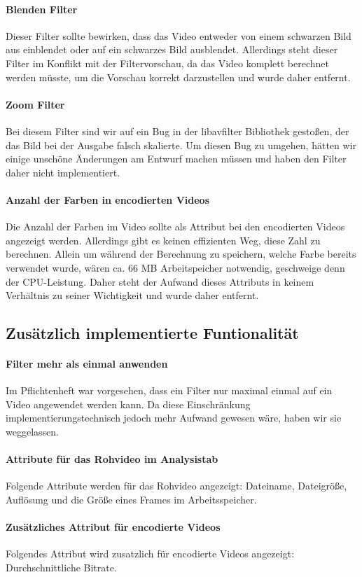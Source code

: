 \documentclass{scrartcl}
\begin{document}
{\paragraph{Blenden Filter} Dieser Filter sollte bewirken, dass das Video entweder von einem schwarzen Bild aus einblendet oder auf ein schwarzes Bild ausblendet. Allerdings steht dieser Filter im Konflikt mit der Filtervorschau, da das Video komplett berechnet werden müsste, um die Vorschau korrekt darzustellen und wurde daher entfernt.
\paragraph{Zoom Filter} Bei diesem Filter sind wir auf ein Bug in der libavfilter Bibliothek gestoßen, der das Bild bei der Ausgabe falsch skalierte. Um diesen Bug zu umgehen, hätten wir einige unschöne Änderungen am Entwurf machen müssen und haben den Filter daher nicht implementiert.
\paragraph{Anzahl der Farben in encodierten Videos} Die Anzahl der Farben im Video sollte als Attribut bei den encodierten Videos angezeigt werden. Allerdings gibt es keinen effizienten Weg, diese Zahl zu berechnen. Allein um während der Berechnung zu speichern, welche Farbe bereits verwendet wurde, wären ca. 66 MB Arbeitspeicher notwendig, geschweige denn der CPU-Leistung. Daher steht der Aufwand dieses Attributs in keinem Verhältnis zu seiner Wichtigkeit und wurde daher entfernt.
\newpage
\subsection{Zusätzlich implementierte Funtionalität}
\bigskip
\paragraph{Filter mehr als einmal anwenden} Im Pflichtenheft war vorgesehen, dass ein Filter nur maximal einmal auf ein Video angewendet werden kann. Da diese Einschränkung implementierungstechnisch jedoch mehr Aufwand gewesen wäre, haben wir sie weggelassen.
\paragraph{Attribute für das Rohvideo im Analysistab} Folgende Attribute werden für das Rohvideo angezeigt: Dateiname, Dateigröße, Auflösung und die Größe eines Frames im Arbeitsspeicher.
\paragraph{Zusätzliches Attribut für encodierte Videos} Folgendes Attribut wird zusatzlich für encodierte Videos angezeigt: Durchschnittliche Bitrate.
}
\end{document}
